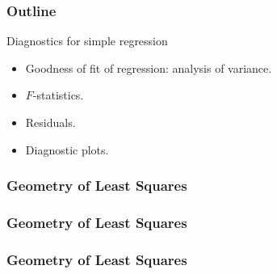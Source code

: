 \documentclass[handout]{beamer}
\begin{document}
   \begin{frame} \frametitle{Outline}

   \begin{block}{Diagnostics for simple regression}
   \begin{itemize}
   \item Goodness of fit of regression: analysis of variance.

   \item $F$-statistics.

   \item Residuals.

   \item Diagnostic plots.
   \end{itemize}
   \end{block}
   \end{frame}


   \begin{frame} \frametitle{Geometry of Least Squares}

   \end{frame}


   \begin{frame} \frametitle{Geometry of Least Squares}

   \end{frame}


   \begin{frame} \frametitle{Geometry of Least Squares}

   \end{frame}

\end{document}

